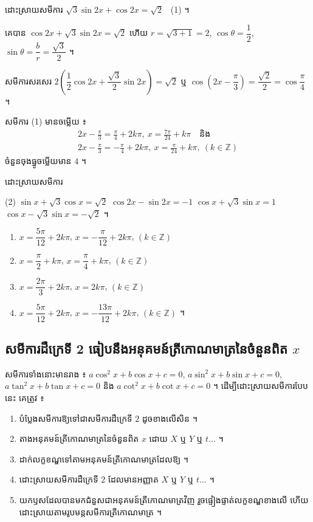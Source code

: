 \begin{example}[លំហាត់គំរូ ១]
ដោះស្រាយសមីការ $\sqrt{3}\sin 2x + \cos 2x = \sqrt{2}$ \ (1) ។
\end{example}
\ans
គេបាន $\cos 2x + \sqrt{3}\sin 2x = \sqrt{2}$ ហើយ $r = \sqrt{3 + 1} = 2$, $\cos\theta = \dfrac{1}{2}$, $\sin\theta = \dfrac{b}{r} = \dfrac{\sqrt{3}}{2}$ ។

សមីការសរសេរ $2\left(\dfrac{1}{2}\cos 2x + \dfrac{\sqrt{3}}{2}\sin 2x\right) = \sqrt{2}$ ឬ $\cos\left(2x - \dfrac{\pi}{3}\right) = \dfrac{\sqrt{2}}{2} = \cos\dfrac{\pi}{4}$ ។

សមីការ (1) មានចម្លើយ ៖
\[
\begin{gathered}
2x - \frac{\pi}{3} = \frac{\pi}{4} + 2k\pi, \ x = \frac{7\pi}{24} + k\pi \quad \text{និង}\\
2x - \frac{\pi}{3} = -\frac{\pi}{4} + 2k\pi, \ x = \frac{\pi}{24} + k\pi, \ (k \in \mathbb{Z})
\end{gathered}
\]
ចំនួនចុងធ្នូចម្លើយមាន $4$ ។

\begin{pro}
ដោះស្រាយសមីការ
\begin{tasks}(2)
  \task $\sin x + \sqrt{3}\cos x = \sqrt{2}$
  \task $\cos 2x - \sin 2x = -1$
  \task $\cos x + \sqrt{3}\sin x = 1$
  \task $\cos x - \sqrt{3}\sin x = -\sqrt{2}$ ។
\end{tasks}
\ans
\begin{enumerate}[a]
  \item $x = \dfrac{5\pi}{12} + 2k\pi$, $x = -\dfrac{\pi}{12} + 2k\pi$, $(k \in \mathbb{Z})$
  \item $x = \dfrac{\pi}{2} + k\pi$, $x = \dfrac{\pi}{4} + k\pi$, $(k \in \mathbb{Z})$
  \item $x = \dfrac{2\pi}{3} + 2k\pi$, $x = 2k\pi$, $(k \in \mathbb{Z})$
  \item $x = \dfrac{5\pi}{12} + 2k\pi$, $x = -\dfrac{13\pi}{12} + 2k\pi$, $(k \in \mathbb{Z})$ ។
\end{enumerate}
\end{pro}

\subsection{សមីការដឺក្រេទី 2 ធៀបនឹងអនុគមន៍ត្រីកោណមាត្រនៃចំនួនពិត \texorpdfstring{$x$}{x}}

សមីការទាំងនោះមានរាង ៖ $a\cos^2 x + b\cos x + c = 0$, $a\sin^2 x + b\sin x + c = 0$, $a\tan^2 x + b\tan x + c = 0$ និង $a\cot^2 x + b\cot x + c = 0$ ។ ដើម្បីដោះស្រាយសមីការបែបនេះ គេត្រូវ ៖
\begin{enumerate}[1]
  \item បំប្លែងសមីការឱ្យទៅជាសមីការដឺក្រេទី $2$ ដូចខាងលើសិន ។
  \item តាងអនុគមន៍ត្រីកោណមាត្រនៃចំនួនពិត $x$ ដោយ $X$ ឬ $Y$ ឬ $t \ldots$ ។
  \item ដាក់លក្ខខណ្ឌទៅតាមអនុគមន៍ត្រីកោណមាត្រដែលឱ្យ ។
  \item ដោះស្រាយសមីការដឺក្រេទី $2$ ដែលមានអញ្ញាត $X$ ឬ $Y$ ឬ $t \ldots$ ។
  \item យកឫសដែលបានមកជំនួសជាអនុគមន៍ត្រីកោណមាត្រវិញ រួចផ្ទៀងផ្ទាត់លក្ខខណ្ឌខាងលើ ហើយដោះស្រាយតាមរូបមន្តសមីការត្រីកោណមាត្រ ។
\end{enumerate}

